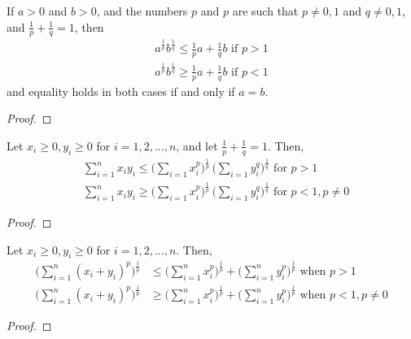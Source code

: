   \begin{lemma}
    If $a>0$ and $b>0$, and the numbers $p$ and $p$ are such that $p \neq 0, 1$ and $q \neq 0, 1$, and $\frac{1}{p} + \frac{1}{q} = 1$, then 
    \begin{align}
      a^{\frac{1}{p}} b^{\frac{1}{q}} \leq \frac{1}{p} a + \frac{1}{q} b \text{  if } p > 1 \\
      a^{\frac{1}{p}} b^{\frac{1}{q}} \geq \frac{1}{p} a + \frac{1}{q} b \text{  if } p < 1
    \end{align}
    and equality holds in both cases if and only if $a = b$. 
  \end{lemma}
  \begin{proof}
    
  \end{proof}

  \begin{lemma}
    Let $x_i \geq 0, y_i \geq 0$ for $i = 1, 2, ..., n$, and let $\frac{1}{p} + \frac{1}{q} = 1$. Then, 
    \begin{align}
      &\sum_{i=1}^n x_i y_i \leq \bigg( \sum_{i=1} x_i^p \bigg)^{\frac{1}{p}} \, \bigg( \sum_{i=1} y_i^q \bigg)^{\frac{1}{q}} \text{  for } p > 1 \\
      &\sum_{i=1}^n x_i y_i \geq \bigg( \sum_{i=1} x_i^p \bigg)^{\frac{1}{p}} \, \bigg( \sum_{i=1} y_i^q \bigg)^{\frac{1}{q}} \text{  for } p < 1, p \neq 0
    \end{align}
  \end{lemma}
  \begin{proof}
    
  \end{proof}

  \begin{lemma}
    Let $x_i \geq 0, y_i \geq 0$ for $i = 1, 2, ... ,n$. Then, 
    \begin{align}
      \bigg( \sum_{i=1}^n (x_i + y_i)^p \bigg)^{\frac{1}{p}} & \leq \bigg( \sum_{i=1}^n x_i^p \bigg)^\frac{1}{p} + \bigg( \sum_{i=1}^n y_i^p \bigg)^{\frac{1}{p}} \text{  when } p > 1 \\
      \bigg( \sum_{i=1}^n (x_i + y_i)^p \bigg)^{\frac{1}{p}} & \geq \bigg( \sum_{i=1}^n x_i^p \bigg)^\frac{1}{p} + \bigg( \sum_{i=1}^n y_i^p \bigg)^{\frac{1}{p}} \text{  when } p < 1, p \neq 0
    \end{align}
  \end{lemma}
  \begin{proof}
    
  \end{proof}

